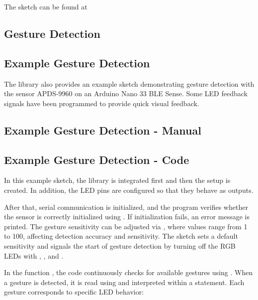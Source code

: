The sketch can be found at 

\bigskip

{
	\label{TestAPDS9960Proximity}
}

\subsection{Gesture Detection}
\subsection{Example Gesture Detection}

The library  also provides an example sketch demonstrating gesture detection with the sensor APDS-9960 on an Arduino Nano 33 BLE Sense. Some LED feedback signals have been programmed to provide quick visual feedback.

\subsection{Example Gesture Detection - Manual}



\subsection{Example Gesture Detection - Code}

In this example sketch, the library  is integrated first and then the setup is created. In addition, the LED pins are configured so that they behave as outputs.


\bigskip

After that, serial communication is initialized, and the program verifies whether the sensor is correctly initialized using . If initialization fails, an error message is printed. The gesture sensitivity can be adjusted via , where values range from 1 to 100, affecting detection accuracy and sensitivity. The sketch sets a default sensitivity and signals the start of gesture detection by turning off the RGB LEDs with , , and .

In the function , the code continuously checks for available gestures using . When a gesture is detected, it is read using  and interpreted within a  statement. Each gesture corresponds to specific LED behavior:

